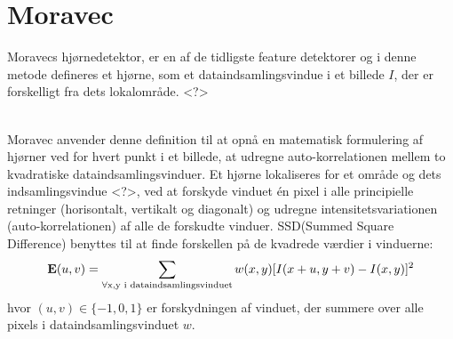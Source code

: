 \section{Moravec}\label{sec:moravec}
Moravecs hjørnedetektor\cite{moravec}, er en af de tidligste feature detektorer og i denne metode defineres et hjørne, som et dataindsamlingsvindue i et billede $I$, der er forskelligt fra dets lokalområde. <?>

\\
Moravec anvender denne definition til at opnå en matematisk formulering af hjørner ved for hvert punkt i et billede, at udregne auto-korrelationen mellem to kvadratiske dataindsamlingsvinduer. Et hjørne lokaliseres for et område og dets indsamlingsvindue <?>, ved at forskyde vinduet én pixel i alle principielle retninger (horisontalt, vertikalt og diagonalt) og udregne intensitetsvariationen (auto-korrelationen) af alle de forskudte vinduer.  SSD(Summed Square Difference) benyttes til at finde forskellen på de kvadrede værdier i vinduerne:
\begin{equation}
\bold{E}(u,v)= \sum_{\forall \text{x,y i dataindsamlingsvinduet}} w(x,y)[I(x+u,y+v) - I(x,y)]^2
\label{moravec}     
\end{equation}
hvor $(u,v)\in \lbrace -1,0,1 \rbrace$ er forskydningen af vinduet, der summere over alle pixels i dataindsamlingsvinduet $w$. 

